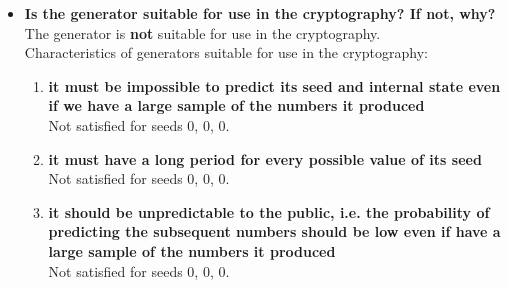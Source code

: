 \documentclass[a4paper,10pt]{article}
\begin{document}
\begin{itemize}
 \item \textbf{Is the generator suitable for use in the cryptography? If not, why?} \\
  The generator is \textbf{not} suitable for use in the cryptography.\\
 Characteristics of generators suitable for use in the cryptography:
  \begin{enumerate}
   \item \textbf{it must be impossible to predict its seed and internal state even if we have a large sample of the numbers it produced} \\
   Not satisfied for seeds 0, 0, 0.
   \item \textbf{it must have a long period for every possible value of its seed} \\
   Not satisfied for seeds 0, 0, 0.
   \item \textbf{it should be unpredictable to the public, i.e. the probability of predicting the subsequent numbers should be low even if have a large sample of the numbers it produced} \\
   Not satisfied for seeds 0, 0, 0.
   \end{enumerate}

\end{itemize}
\end{document}
